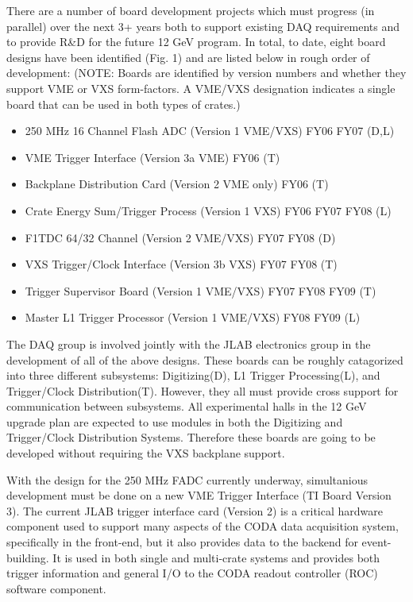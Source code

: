 \documentclass[10pt]{article}
\begin{document}
There are a number of board development projects which must progress (in parallel) over the next 3+
years both to support existing DAQ requirements and to provide R\&D for the future 12 GeV program.
In total, to date, eight board designs have been identified (Fig. 1) and are listed below in rough 
order of development:
(NOTE: Boards are identified by version numbers and whether they support VME or VXS form-factors. A
VME/VXS designation indicates a single board that can be used in both types of crates.)
\begin{itemize}
\item 250 MHz 16 Channel Flash ADC (Version 1 VME/VXS)  FY06 FY07           (D,L)
\item VME Trigger Interface (Version 3a VME)            FY06                (T)
\item Backplane Distribution Card (Version 2 VME only)  FY06                (T)
\item Crate Energy Sum/Trigger Process (Version 1 VXS)  FY06 FY07 FY08      (L)
\item F1TDC 64/32 Channel (Version 2 VME/VXS)                FY07 FY08      (D)
\item VXS Trigger/Clock Interface (Version 3b VXS)           FY07 FY08      (T)
\item Trigger Supervisor Board (Version 1 VME/VXS)           FY07 FY08 FY09 (T)
\item Master L1 Trigger Processor (Version 1 VME/VXS)             FY08 FY09 (L)
\end{itemize}

The DAQ group is involved jointly with the JLAB electronics group in the 
development of all of the above designs. These boards can be roughly catagorized into
three different subsystems: Digitizing(D), L1 Trigger Processing(L), and Trigger/Clock 
Distribution(T). However, they all must provide cross support for communication between subsystems.
All experimental halls in the 12 GeV upgrade plan are expected to use modules in both
the Digitizing and Trigger/Clock Distribution Systems. Therefore these boards are going
to be developed without requiring the VXS backplane support.

With the design for the 250 MHz FADC currently underway, simultanious development must be 
done on a new VME Trigger Interface (TI Board Version 3). The current JLAB trigger interface 
card (Version 2) is a critical hardware component used to support many aspects of the CODA data 
acquisition system, specifically in the front-end, but it also provides data 
to the backend for event-building. It is used in both single and multi-crate systems 
and provides both trigger information and general I/O to the CODA readout controller (ROC) 
software component.
\end{document}
